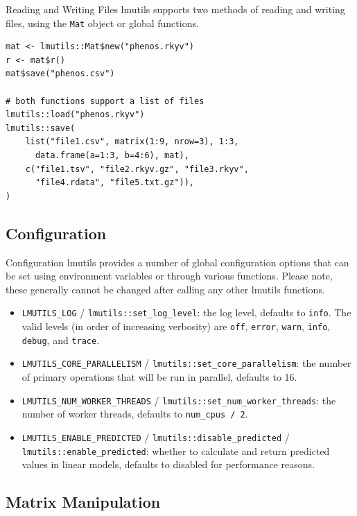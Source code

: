 \documentclass[10pt,handout]{beamer}
\begin{document}
\begin{frame}[fragile]{Reading and Writing Files}
  lmutils supports two methods of reading and writing files, using the \texttt{Mat} object or global functions.
  \begin{verbatim}
mat <- lmutils::Mat$new("phenos.rkyv")
r <- mat$r()
mat$save("phenos.csv")

# both functions support a list of files
lmutils::load("phenos.rkyv")
lmutils::save(
    list("file1.csv", matrix(1:9, nrow=3), 1:3,
      data.frame(a=1:3, b=4:6), mat),
    c("file1.tsv", "file2.rkyv.gz", "file3.rkyv",
      "file4.rdata", "file5.txt.gz")),
)
\end{verbatim}
\end{frame}

\subsection{Configuration}

\begin{frame}{Configuration}
  lmutils provides a number of global configuration options that can be set using environment variables or through various functions. Please note, these generally cannot be changed after calling any other lmutils functions.
  \begin{itemize}[<+->]
    \item \texttt{LMUTILS\_LOG} / \texttt{lmutils::set\_log\_level}: the log level, defaults to \texttt{info}. The valid levels (in order of increasing verbosity) are \texttt{off}, \texttt{error}, \texttt{warn}, \texttt{info}, \texttt{debug}, and \texttt{trace}.
    \item \texttt{LMUTILS\_CORE\_PARALLELISM} / \texttt{lmutils::set\_core\_parallelism}: the number of primary operations that will be run in parallel, defaults to 16.
    \item \texttt{LMUTILS\_NUM\_WORKER\_THREADS} / \texttt{lmutils::set\_num\_worker\_threads}: the number of worker threads, defaults to \texttt{num\_cpus / 2}.
    \item \texttt{LMUTILS\_ENABLE\_PREDICTED} / \texttt{lmutils::disable\_predicted} / \texttt{lmutils::enable\_predicted}: whether to calculate and return predicted values in linear models, defaults to disabled for performance reasons.
  \end{itemize}
\end{frame}

\subsection{Matrix Manipulation}
\end{document}
